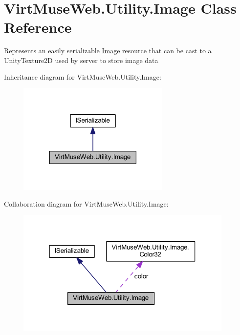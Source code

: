 \hypertarget{class_virt_muse_web_1_1_utility_1_1_image}{}\section{Virt\+Muse\+Web.\+Utility.\+Image Class Reference}
\label{class_virt_muse_web_1_1_utility_1_1_image}


Represents an easily serializable \mbox{\hyperlink{class_virt_muse_web_1_1_utility_1_1_image}{Image}} resource that can be cast to a Unity\+Texture2D used by server to store image data  




Inheritance diagram for Virt\+Muse\+Web.\+Utility.\+Image\+:
\nopagebreak
\begin{figure}[H]
\begin{center}
\leavevmode
\includegraphics[width=213pt]{class_virt_muse_web_1_1_utility_1_1_image__inherit__graph}
\end{center}
\end{figure}


Collaboration diagram for Virt\+Muse\+Web.\+Utility.\+Image\+:
\nopagebreak
\begin{figure}[H]
\begin{center}
\leavevmode
\includegraphics[width=304pt]{class_virt_muse_web_1_1_utility_1_1_image__coll__graph}
\end{center}
\end{figure}
